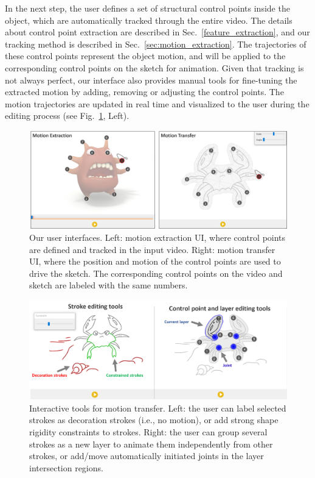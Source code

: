 In the next step, the user defines a set of structural control points inside the object, which are automatically tracked through the entire video. The details about control point extraction are described in Sec.~\ref{feature_extraction}, and our tracking method is described in Sec.~\ref{sec:motion_extraction}.  
The trajectories of these control points represent the object motion, and will be applied to the corresponding control points on the sketch for animation. 
Given that tracking is not always perfect, our interface also provides manual tools for fine-tuning the extracted motion by adding, removing or adjusting the control points. The motion trajectories are updated in real time and visualized to the user during the editing process (see Fig.~\ref{fig:ui2}, Left). 
\begin{figure}
	\centering
	\includegraphics[width=\linewidth]{images/ui2}
	\caption{Our user interfaces. Left: motion extraction UI, where control points are defined and tracked in the input video. Right: motion transfer UI, where the position and motion of the control points are used to drive the sketch. The corresponding control points on the video and sketch are labeled with the same numbers.}
	\label{fig:ui2}
\end{figure}

\begin{figure}
	\centering
	\includegraphics[width=\linewidth]{images/othertools}
	\caption{Interactive tools for motion transfer. Left: the user can label selected strokes as decoration strokes (i.e., no motion), or add strong shape rigidity constraints to strokes. Right: the user can group several strokes as a new layer to animate them independently from other strokes, or add/move automatically initiated joints in the layer intersection regions. }
	\label{fig:othertools}
\end{figure}

